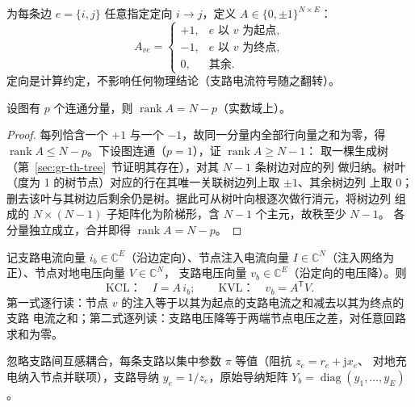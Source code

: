 \begin{definition}[节点-支路关联矩阵]
为每条边 $e=\{i,j\}$ 任意指定定向 $i\to j$，定义
$A\in\{0,\pm1\}^{N\times E}$：
\begin{equation}
A_{ve}=\begin{cases}
+1,& e \text{ 以 } v \text{ 为起点},\\
-1,& e \text{ 以 } v \text{ 为终点},\\
0,& \text{其余}.
\end{cases}
\end{equation}
定向是计算约定，不影响任何物理结论（支路电流符号随之翻转）。
\end{definition}

\begin{proposition}[关联矩阵的秩]\label{sec:gr-th-rankA}
设图有 $p$ 个连通分量，则 $\operatorname{rank}A=N-p$（实数域上）。
\end{proposition}
\begin{proof}
每列恰含一个 $+1$ 与一个 $-1$，故同一分量内全部行向量之和为零，得
$\operatorname{rank}A\le N-p$。下设图连通（$p=1$），证 $\operatorname{rank}A\ge N-1$：
取一棵生成树（第~\ref{sec:gr-th-tree}~节证明其存在），对其 $N-1$ 条树边对应的列
做归纳。树叶（度为 1 的树节点）对应的行在其唯一关联树边列上取 $\pm1$、其余树边列
上取 $0$；删去该叶与其树边后剩余仍是树。据此可从树叶向根逐次做行消元，将树边列
组成的 $N\times(N-1)$ 子矩阵化为阶梯形，含 $N-1$ 个主元，故秩至少 $N-1$。
各分量独立成立，合并即得 $\operatorname{rank}A=N-p$。
\end{proof}

\begin{definition}
记支路电流向量 $i_b\in\mathbb C^{E}$（沿边定向）、节点注入电流向量
$I\in\mathbb C^{N}$（注入网络为正）、节点对地电压向量 $V\in\mathbb C^{N}$，
支路电压向量 $v_b\in\mathbb C^{E}$（沿定向的电压降）。则
\begin{equation}
\text{KCL：}\quad I=A\,i_b;\qquad
\text{KVL：}\quad v_b=A^{\mathsf T}V.
\end{equation}
第一式逐行读：节点 $v$ 的注入等于以其为起点的支路电流之和减去以其为终点的支路
电流之和；第二式逐列读：支路电压降等于两端节点电压之差，对任意回路求和为零。
\end{definition}

\begin{definition}[支路原始导纳]
忽略支路间互感耦合，每条支路以集中参数 $\pi$ 等值（阻抗 $z_e=r_e+\mathrm jx_e$、
对地充电纳入节点并联项），支路导纳 $y_e=1/z_e$，原始导纳矩阵
$Y_b=\operatorname{diag}(y_1,\dots,y_E)$。
\end{definition}

